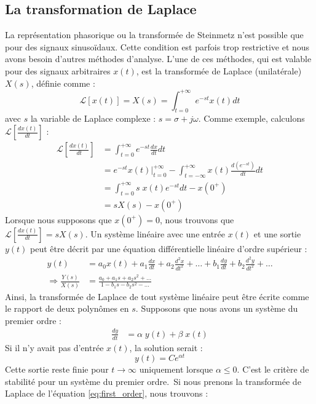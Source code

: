 \subsection{La transformation de Laplace}
\label{sec:laplace}

La représentation phasorique ou la transformée de Steinmetz n'est possible que pour des signaux sinusoïdaux. Cette condition est parfois trop restrictive et nous avons besoin d'autres méthodes d'analyse. L'une de ces méthodes, qui est valable pour des signaux arbitraires $x(t)$, est la transformée de Laplace (unilatérale) $X(s)$, définie comme :
$$
\mathcal{L}[x(t)] = X(s) = \int_{t = 0}^{+\infty} e^{-st} x(t) dt
$$
avec $s$ la variable de Laplace complexe : $s = \sigma + j\omega$. Comme exemple, calculons $\mathcal{L}[\frac{dx(t)}{dt}]$ :
\begin{align*}
	\mathcal{L}[\frac{dx(t)}{dt}] &= \int_{t = 0}^{+\infty} e^{-st} \frac{dx}{dt} dt \\
	&= e^{-st} x(t) |_{t = 0}^{+\infty} - \int_{t = -\infty}^{+\infty} x(t) \frac{d(e^{-st})}{dt} dt \\
	&= \int_{t = 0}^{+\infty} s \; x(t) e^{-st} dt - x(0^+)\\
	&= s X(s) - x(0^+)
\end{align*}
Lorsque nous supposons que $x(0^+) = 0$, nous trouvons que $\mathcal{L}[\frac{dx(t)}{dt}] = s X(s)$. Un système linéaire avec une entrée $x(t)$ et une sortie $y(t)$ peut être décrit par une équation différentielle linéaire d'ordre supérieur :
\begin{align*}
	y(t) &= a_0 x(t) + a_1 \frac{dx}{dt} + a_2 \frac{d^2 x}{dt^2} + \ldots + b_1 \frac{dy}{dt} + b_2 \frac{d^2 y}{dt^2} + \ldots \\
	\Rightarrow \frac{Y(s)}{X(s)} &= \frac{a_0 + a_1 s + a_2 s^2 + \ldots}{1 - b_1 s - b_2 s^2 - \ldots}
\end{align*}
Ainsi, la transformée de Laplace de tout système linéaire peut être écrite comme le rapport de deux polynômes en $s$. Supposons que nous avons un système du premier ordre :
\begin{align}
	\frac{dy}{dt} &= \alpha \; y(t) + \beta \; x(t)
	\label{eq:first_order}
\end{align}
Si il n'y avait pas d'entrée $x(t)$, la solution serait :
$$
y(t) = C e^{\alpha t}
$$
Cette sortie reste finie pour $t \rightarrow \infty$ uniquement lorsque $\alpha \le 0$. C'est le critère de stabilité pour un système du premier ordre.\
Si nous prenons la transformée de Laplace de l'équation \ref{eq:first_order}, nous trouvons :
